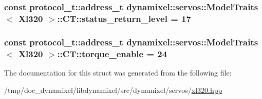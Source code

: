 \subsubsection[{\texorpdfstring{status\+\_\+return\+\_\+level}{status_return_level}}]{\setlength{\rightskip}{0pt plus 5cm}const {\bf protocol\+\_\+t\+::address\+\_\+t} {\bf dynamixel\+::servos\+::\+Model\+Traits}$<$ {\bf Xl320} $>$\+::C\+T\+::status\+\_\+return\+\_\+level = 17\hspace{0.3cm}{\ttfamily [static]}}\hypertarget{structdynamixel_1_1servos_1_1_model_traits_3_01_xl320_01_4_1_1_c_t_aa9d72b396ee7d508e32ba5a68b55feda}{}\label{structdynamixel_1_1servos_1_1_model_traits_3_01_xl320_01_4_1_1_c_t_aa9d72b396ee7d508e32ba5a68b55feda}
\subsubsection[{\texorpdfstring{torque\+\_\+enable}{torque_enable}}]{\setlength{\rightskip}{0pt plus 5cm}const {\bf protocol\+\_\+t\+::address\+\_\+t} {\bf dynamixel\+::servos\+::\+Model\+Traits}$<$ {\bf Xl320} $>$\+::C\+T\+::torque\+\_\+enable = 24\hspace{0.3cm}{\ttfamily [static]}}\hypertarget{structdynamixel_1_1servos_1_1_model_traits_3_01_xl320_01_4_1_1_c_t_aab87f65d081b09743aa8266380957437}{}\label{structdynamixel_1_1servos_1_1_model_traits_3_01_xl320_01_4_1_1_c_t_aab87f65d081b09743aa8266380957437}


The documentation for this struct was generated from the following file\+:\begin{DoxyCompactItemize}
\item 
/tmp/doc\+\_\+dynamixel/libdynamixel/src/dynamixel/servos/\hyperlink{xl320_8hpp}{xl320.\+hpp}\end{DoxyCompactItemize}
